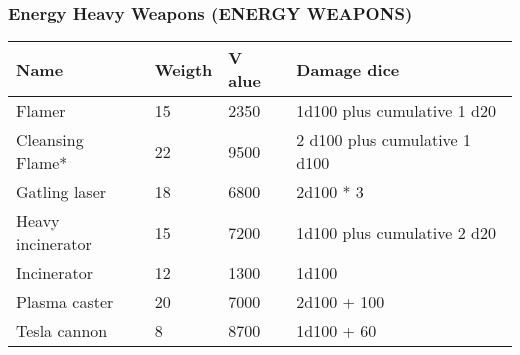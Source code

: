 
\subsubsection{Energy Heavy Weapons (ENERGY WEAPONS)}
\begin{longtable}{|p{4cm}|p{1.5cm}|p{1.5cm}|p{9cm}|}
\hline
\bfseries Name & \bfseries Weigth & \bfseries V alue & \bfseries Damage dice \\
\hline
\endhead
Flamer  & 15 & 2350 & 1d100 plus  cumulative  1 d20 \\
Cleansing Flame* & 22 & 9500 & 2 d100 plus  cumulative  1 d100 \\
Gatling laser  & 18 & 6800 & 2d100 * 3 \\
Heavy incinerator  & 15 & 7200 & 1d100 plus  cumulative 2 d20   \\
Incinerator  & 12 & 1300 & 1d100 \\
Plasma caster  & 20 & 7000 & 2d100 + 100 \\
Tesla cannon  & 8 & 8700 & 1d100 + 60 \\
\hline
\end{longtable}
